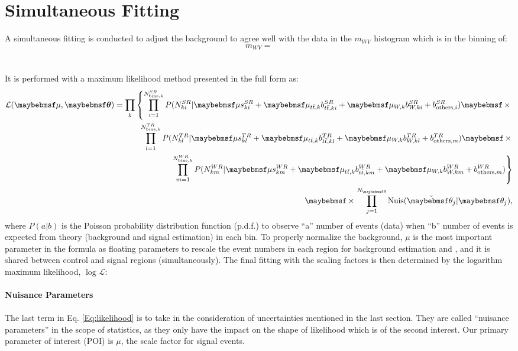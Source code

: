 \section{Simultaneous Fitting}
A simultaneous fitting is conducted to adjust the background to agree well with the data in the $m_{WV}$ histogram which is in the binning of:
\begin{equation}
m_{WV}={}
\end{equation}
\\
\\It is performed with a maximum likelihood method presented in the full form as:
 \begin{eqnarray}
 \mathcal{L}(\mu, \mbox{\boldmath $\theta$}) = \displaystyle\prod_{k} \left\{
 \displaystyle\prod_{i=1}^{N_{{\rm bins},k}^{SR}}P(N_{ki}^{SR}|\mu s_{ki}^{SR} + \mu_{t\bar{t},k} b_{t\bar{t},ki}^{SR} + \mu_{W,k} b_{W,ki}^{SR} + b_{{\rm others},i}^{SR})
 \times \right. \nonumber \\
 \displaystyle\prod_{l=1}^{N_{{\rm bins},k}^{TR}}P(N_{kl}^{TR}|\mu s_{kl}^{TR} + \mu_{t\bar{t},k} b_{t\bar{t},kl}^{TR} + \mu_{W,k} b_{W,kl}^{TR} + b_{{\rm others},m}^{TR})
 \times \nonumber \\
 \left. \displaystyle\prod_{m=1}^{N_{{\rm bins},k}^{WR}}P(N_{km}^{WR}|\mu s_{km}^{WR} + \mu_{t\bar{t},k} b_{t\bar{t},km}^{WR} + \mu_{W,k} b_{W,km}^{WR} + b_{{\rm others},m}^{WR})
 \right\} \nonumber \\
 \times\displaystyle\prod_{j=1}^{N_{\theta}}{\rm Nuis}(\tilde{\theta_j}|\theta_j),
 \label{Eq:likelihood}
 \end{eqnarray}
where $P(a|b)$ is the Poisson probability distribution function (p.d.f.) to observe ``a'' number of events (data) when ``b'' number of events is expected from theory (background and signal estimation) in each bin. To properly normalize the background, $\mu$ is the most important parameter in the formula as floating parameters to rescale the event numbers in each region for background estimation and , and it is shared between control and signal regions (simultaneously). The final fitting with the scaling factors is then determined by the logarithm maximum likelihood, $\log{\mathcal{L}}$:
\\
\\{\bf Nuisance Parameters}
\\
\\The last term in Eq. \ref{Eq:likelihood} is to take in the consideration of uncertainties mentioned in the last section. They are called ``nuisance parameters'' in the scope of statistics, as they only have the impact on the shape of likelihood which is of the second interest. Our primary parameter of interest (POI) is $\mu$, the scale factor for signal events.
